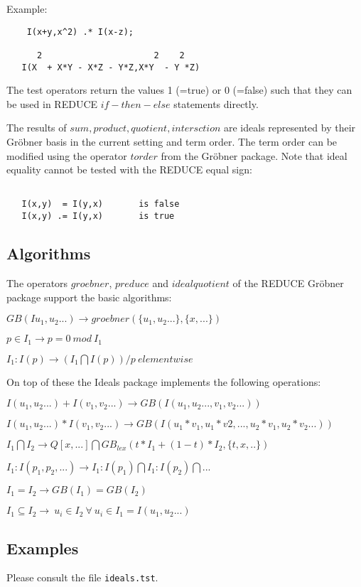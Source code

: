 Example:

\begin{verbatim}
    I(x+y,x^2) .* I(x-z);

      2                      2    2
   I(X  + X*Y - X*Z - Y*Z,X*Y  - Y *Z)
\end{verbatim}

The test operators return the values 1 (=true) or 0 (=false)
such that they can be used in REDUCE $if-then-else$ statements
directly.

The results of $sum,product, quotient,intersction$ are ideals
represented by their Gr\"obner basis in the current setting and
term order. The term order can be modified using the operator
$torder$ from the Gr\"obner package. Note that ideal equality 
cannot be tested with the REDUCE equal sign:

\begin{verbatim}

   I(x,y)  = I(y,x)       is false
   I(x,y) .= I(y,x)       is true

\end{verbatim}

\subsection{Algorithms}

The operators $groebner$, $preduce$ and $idealquotient$ of the 
REDUCE Gr\"obner package support the basic algorithms:

$GB(Iu_1,u_2...) \rightarrow groebner(\{u_1,u_2...\},\{x,...\})$

$p \in I_1 \rightarrow p=0 \ mod \ I_1$

$I_1 : I(p) \rightarrow (I_1 \bigcap I(p)) / p \ elementwise$

\noindent
On top of these the Ideals package implements the following 
operations:


$I(u_1,u_2...)+I(v_1,v_2...) \rightarrow GB(I(u_1,u_2...,v_1,v_2...))$


$I(u_1,u_2...)*I(v_1,v_2...)\rightarrow 
 GB(I(u_1*v_1,u_1*v2,...,u_2*v_1,u_2*v_2...))$


$I_1 \bigcap I_2 \rightarrow
  Q[x,...] \bigcap GB_{lex}(t*I_1 + (1-t)*I_2,\{t,x,..\}) $


$I_1 : I(p_1,p_2,...) \rightarrow I_1 : I(p_1) \bigcap I_1 : I(p_2)
\bigcap ...$

$I_1 = I_2 \rightarrow GB(I_1)=GB(I_2)$

$I_1 \subseteq I_2
   \rightarrow \ u_i \in I_2 \ \forall \ u_i \in I_1=I(u_1,u_2...)$

\subsection{Examples}

Please consult the file \texttt{ideals.tst}.

